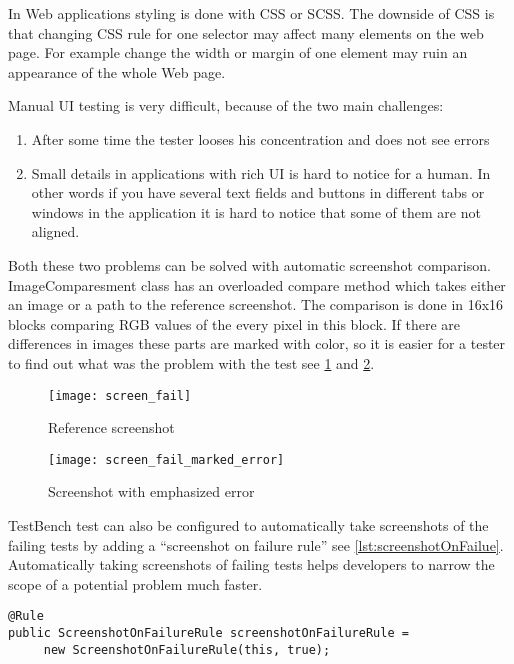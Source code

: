 In Web applications styling is done with CSS or SCSS. The downside of CSS 
is that changing CSS rule for one selector may affect many elements on the
web page. For example change the width or margin of one element may ruin an
appearance of the whole Web page.

Manual UI testing is very difficult, because of the two main challenges:
\begin{enumerate}
  \item After some time the tester looses his concentration and does not see
  errors
  \item Small details in applications with rich UI is hard to notice for a
  human. In other words if you have several text fields and buttons in different
  tabs or windows in the application it is hard to notice that some of them are
  not aligned.
\end{enumerate}

Both these two problems can be solved with automatic screenshot comparison.
ImageComparesment class has an overloaded compare method which takes either an
image or a path to the reference screenshot. The comparison is done in 16x16
blocks comparing RGB values of the every pixel in this block. If there are
differences in images these parts are marked with color, so it is easier for a
tester to find out what was the problem with the test see
\ref{fig:failedscreen} and \ref{fig:failedscreenmarked}.

	\begin{figure}
	\centering
	\texttt{[image: screen\_fail]}
	\caption{Reference screenshot}
	\label{fig:failedscreen}
	\end{figure}

	\begin{figure}
	\centering
	\texttt{[image: screen\_fail\_marked\_error]}
	\caption{Screenshot with emphasized error}
	\label{fig:failedscreenmarked}
	\end{figure}

TestBench test can also be configured to automatically take screenshots of the failing tests by adding
a ``screenshot on failure rule'' see \ref{lst:screenshotOnFailue}. Automatically
taking screenshots of failing tests helps developers to narrow the
scope of a potential problem much faster.

\lstset{style=a1listing}
  	\begin{lstlisting}[caption=Adding screenshot on failure	rule,label={lst:screenshotOnFailue}]
@Rule
public ScreenshotOnFailureRule screenshotOnFailureRule =
	 new ScreenshotOnFailureRule(this, true);
	\end{lstlisting}

